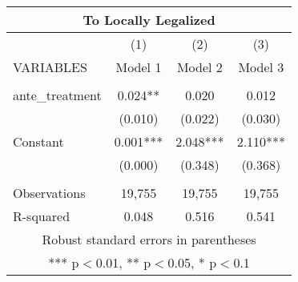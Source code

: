 \begin{tabular}{lccc}
\multicolumn{4}{c}{To Locally Legalized} \\ \hline
 & (1) & (2) & (3) \\
VARIABLES & Model 1 & Model 2 & Model 3 \\ \hline
 &  &  &  \\
ante\_treatment & 0.024** & 0.020 & 0.012 \\
 & (0.010) & (0.022) & (0.030) \\
Constant & 0.001*** & 2.048*** & 2.110*** \\
 & (0.000) & (0.348) & (0.368) \\
 &  &  &  \\
Observations & 19,755 & 19,755 & 19,755 \\
 R-squared & 0.048 & 0.516 & 0.541 \\ \hline
\multicolumn{4}{c}{ Robust standard errors in parentheses} \\
\multicolumn{4}{c}{ *** p$<$0.01, ** p$<$0.05, * p$<$0.1} \\
\end{tabular}
